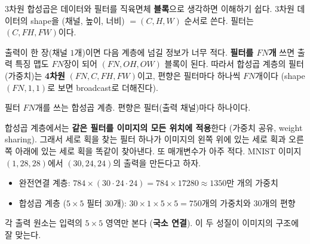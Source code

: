 \documentclass[11pt,a4paper]{article}
\begin{document}
3차원 합성곱은 데이터와 필터를 직육면체 \textbf{블록}으로 생각하면 이해하기 쉽다.
3차원 데이터의 shape을 (채널, 높이, 너비) $=(C,H,W)$ 순서로 쓴다.
필터는 $(C,FH,FW)$이다.

\begin{center}
\end{center}

출력이 한 장(채널 $1$개)이면 다음 계층에 넘길 정보가 너무 적다.
\textbf{필터를 $FN$개} 쓰면 출력 특징 맵도 $FN$장이 되어 $(FN,OH,OW)$ 블록이 된다.
따라서 합성곱 계층의 필터(가중치)는 \textbf{4차원} $(FN,C,FH,FW)$이고,
편향은 필터마다 하나씩 $FN$개이다 (shape $(FN,1,1)$로 보면 broadcast로 더해진다).

\begin{center}

\small 필터 $FN$개를 쓰는 합성곱 계층. 편향은 필터(출력 채널)마다 하나이다.
\end{center}

\begin{thinkbox}
합성곱 계층에서는 \textbf{같은 필터를 이미지의 모든 위치에 적용}한다 (가중치 공유, weight sharing).
그래서 세로 획을 찾는 필터 하나가 이미지의 왼쪽 위에 있는 세로 획과 오른쪽 아래에 있는 세로 획을 똑같이 찾아낸다.
또 매개변수가 아주 적다. MNIST 이미지 $(1,28,28)$에서 $(30,24,24)$의 출력을 만든다고 하자.
\begin{itemize}[leftmargin=1.5em]
\item 완전연결 계층: $784\times(30\cdot24\cdot24)=784\times17280\approx1350$만 개의 가중치
\item 합성곱 계층 ($5\times5$ 필터 $30$개): $30\times1\times5\times5=750$개의 가중치와 $30$개의 편향
\end{itemize}
각 출력 원소는 입력의 $5\times5$ 영역만 본다 (\textbf{국소 연결}). 이 두 성질이 이미지의 구조에 잘 맞는다.
\end{thinkbox}
\end{document}
